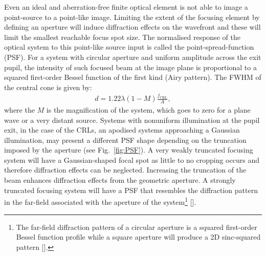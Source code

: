\begin{refsection}
Even an ideal and aberration-free finite optical element is not able to image a point-source to a point-like image. Limiting the extent of the focusing element by defining an aperture will induce diffraction effects on the wavefront and these will limit the smallest reachable focus spot size. The normalised response of the optical system to this point-like source input is called the point-spread-function (PSF). For a system with circular aperture and uniform amplitude across the exit pupil, the intensity of such focused beam at the image plane is proportional to a squared first-order Bessel function of the first kind (Airy pattern). The FWHM of the central cone is given by:
\begin{align}\label{eq:PSF}
    d = 1.22\lambda (1-M)\frac{f_{\text{CRL}}}{A},
\end{align}{}
where the $M$ is the magnification of the system, which goes to zero for a plane wave or a very distant source. Systems with nonuniform illumination at the pupil exit, in the case of the CRLs, an apodised systems approaching a Gaussian illumination, may present a different PSF shape depending on the truncation imposed by the aperture  (see Fig.~\ref{fig:PSF}). A very weakly truncated focusing system will have a Gaussian-shaped focal spot as little to no cropping occurs and therefore diffraction effects can be neglected. Increasing the truncation of the beam enhances diffraction effects from the geometric aperture. A strongly truncated focusing system will have a PSF that resembles the diffraction pattern in the far-field associated with the aperture of the system\footnote{The far-field diffraction pattern of a circular aperture is a squared first-order Bessel function profile while a square aperture will produce a 2D sinc-squared pattern [\cite{Guasti1993}].} [\cite{Mahajan1986}]. 




\end{refsection}
